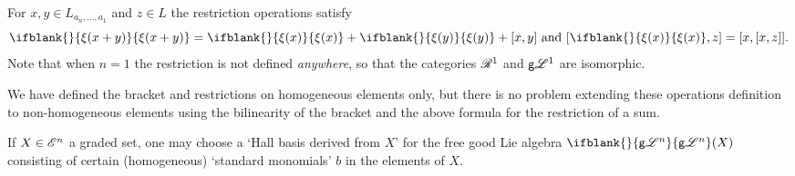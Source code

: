 \documentclass[10pt]{article}
\newcommand{\GS}[1]{\scrE^{#1}}
\newcommand{\GoodLie}[1]{\mathsf{g}{\scrL}^{#1}}%
\newcommand{\BadLie}[1]{\mathsf{b}{\scrL}^{#1}}%
\newcommand{\PRLie}[1]{\scrR^{#1}}%
\newcommand{\Fr}[2][]{\ifblank{#1}{#2}{#2_{#1}}}
\newcommand{\restn}[2][]{\ifblank{#1}{\xi{#2}}{\xi_{#1}{#2}}}%
\begin{document}
\begin{CategoriesOfInterest}
\begin{itemize}
For $x,y\in L_{a_n,\ldots,a_1}$ and $z\in L$ the restriction operations satisfy \[\restn{(x+y)}=\restn{(x)}+\restn{(y)}+[x,y]\textup{ and }[\restn{(x)},z]=[x,[x,z]].\]
Note that when $n=1$ the restriction is not defined \emph{anywhere}, so that the categories $\PRLie{1}$ and $\GoodLie{1}$ are isomorphic.
\end{itemize}
We have defined the bracket and restrictions on homogeneous elements only, but there is no problem extending these operations definition to non-homogeneous elements using the bilinearity of the bracket and the above formula for the restriction of a sum.

If $X\in\GS{n}$ a graded set, one may choose a `Hall basis derived from $X$' \cite{MR0038336} for the free good Lie algebra $\Fr{\GoodLie{n}}(X)$ consisting of certain (homogeneous) `standard monomials' $b$ in the elements of $X$.


\end{CategoriesOfInterest}
\end{document}
